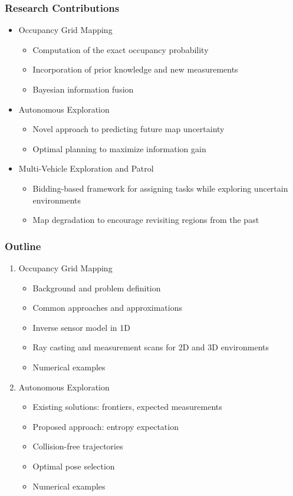 \documentclass[11pt,professionalfonts,hyperref={pdftex,pdfpagemode=none,pdfstartview=FitH}]{beamer}
\begin{document}
\begin{frame}
\frametitle{Research Contributions}
\begin{itemize}
	\item Occupancy Grid Mapping
		\begin{itemize}
		\item Computation of the exact occupancy probability
		\item Incorporation of prior knowledge and new measurements
		\item Bayesian information fusion
	\end{itemize}
	\pause
	\item Autonomous Exploration
	\begin{itemize}
		\item Novel approach to predicting future map uncertainty
		\item Optimal planning to maximize information gain
	\end{itemize}
	\pause
	\item Multi-Vehicle Exploration and Patrol
	\begin{itemize}
		\item Bidding-based framework for assigning tasks while exploring uncertain environments
		\item Map degradation to encourage revisiting regions from the past 
	\end{itemize}
\end{itemize}
\end{frame}

\begin{frame}
\frametitle{Outline}
\begin{enumerate}[I]
	\item Occupancy Grid Mapping
	\begin{itemize}
		\item Background and problem definition
		\item Common approaches and approximations
		\item Inverse sensor model in 1D
		\item Ray casting and measurement scans for 2D and 3D environments
		\item Numerical examples
	\end{itemize}
	\pause
	\item Autonomous Exploration
	\begin{itemize}
		\item Existing solutions: frontiers, expected measurements
		\item Proposed approach: entropy expectation
		\item Collision-free trajectories
		\item Optimal pose selection
		\item Numerical examples
	\end{itemize}
\end{enumerate}
\end{frame}
\end{document}
